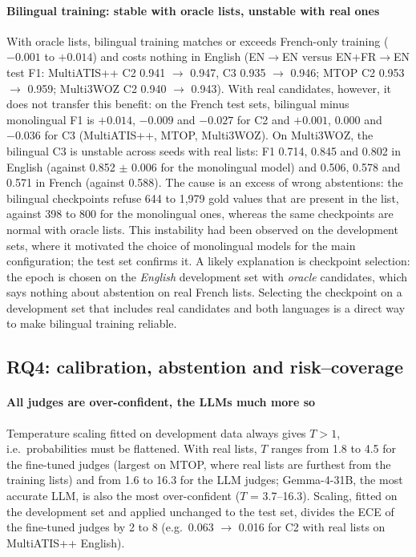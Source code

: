 \paragraph{Bilingual training: stable with oracle lists, unstable with real ones} With oracle lists, bilingual training matches or exceeds French-only training ($-0.001$ to $+0.014$) and costs nothing in English (EN$\rightarrow$EN versus EN+FR$\rightarrow$EN test F1: MultiATIS++ C2 0.941 $\rightarrow$ 0.947, C3 0.935 $\rightarrow$ 0.946; MTOP C2 0.953 $\rightarrow$ 0.959; Multi3WOZ C2 0.940 $\rightarrow$ 0.943). With real candidates, however, it does not transfer this benefit: on the French test sets, bilingual minus monolingual F1 is $+0.014$, $-0.009$ and $-0.027$ for C2 and $+0.001$, $0.000$ and $-0.036$ for C3 (MultiATIS++, MTOP, Multi3WOZ). On Multi3WOZ, the bilingual C3 is unstable across seeds with real lists: F1 0.714, 0.845 and 0.802 in English (against 0.852 $\pm$ 0.006 for the monolingual model) and 0.506, 0.578 and 0.571 in French (against 0.588). The cause is an excess of wrong abstentions: the bilingual checkpoints refuse 644 to 1,979 gold values that are present in the list, against 398 to 800 for the monolingual ones, whereas the same checkpoints are normal with oracle lists. This instability had been observed on the development sets, where it motivated the choice of monolingual models for the main configuration; the test set confirms it. A likely explanation is checkpoint selection: the epoch is chosen on the \emph{English} development set with \emph{oracle} candidates, which says nothing about abstention on real French lists. Selecting the checkpoint on a development set that includes real candidates and both languages is a direct way to make bilingual training reliable.

\subsection{RQ4: calibration, abstention and risk--coverage}
\label{sec:rq4}

\paragraph{All judges are over-confident, the LLMs much more so} Temperature scaling fitted on development data always gives $T>1$, i.e.\ probabilities must be flattened. With real lists, $T$ ranges from 1.8 to 4.5 for the fine-tuned judges (largest on MTOP, where real lists are furthest from the training lists) and from 1.6 to 16.3 for the LLM judges; Gemma-4-31B, the most accurate LLM, is also the most over-confident ($T$ = 3.7--16.3). Scaling, fitted on the development set and applied unchanged to the test set, divides the ECE of the fine-tuned judges by 2 to 8 (e.g.\ 0.063 $\rightarrow$ 0.016 for C2 with real lists on MultiATIS++ English).

